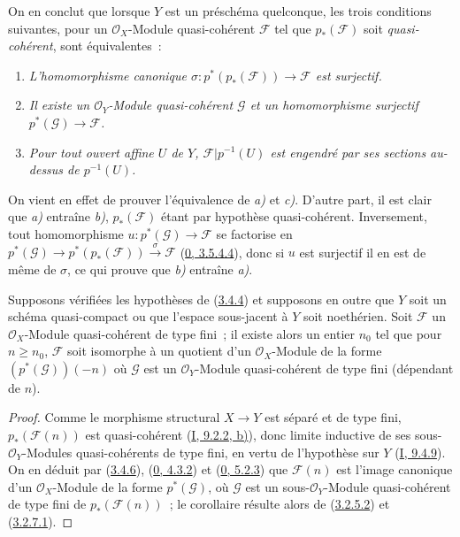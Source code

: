 
On en conclut que lorsque $Y$ est un préschéma quelconque, les trois
conditions suivantes, pour un $\mathcal{O}_X$-Module quasi-cohérent
$\mathcal{F}$ tel que $p_*(\mathcal{F})$ soit \emph{quasi-cohérent}, sont
équivalentes~:
\begin{enumerate}
  \item[a)] \emph{L'homomorphisme canonique
    $\sigma:p^*(p_*(\mathcal{F}))\to\mathcal{F}$ est surjectif.}
  \item[b)] \emph{Il existe un $\mathcal{O}_Y$-Module quasi-cohérent
    $\mathcal{G}$ et un homomorphisme surjectif
    $p^*(\mathcal{G})\to\mathcal{F}$.}
  \item[c)] \emph{Pour tout ouvert affine $U$ de $Y$,
    $\mathcal{F}|p^{-1}(U)$ est engendré par ses sections au-dessus de
    $p^{-1}(U)$.}
\end{enumerate}
On vient en effet de prouver l'équivalence de \emph{a)} et \emph{c)}. D'autre
part, il est clair que \emph{a)} entraîne \emph{b)}, $p_*(\mathcal{F})$ étant
par hypothèse quasi-cohérent. Inversement, tout homomorphisme
$u:p^*(\mathcal{G})\to\mathcal{F}$ se factorise en
$p^*(\mathcal{G})\to p^*(p_*(\mathcal{F}))\xrightarrow{\sigma}\mathcal{F}$
(\hyperref[0.3.5.4.4-fr]{0, 3.5.4.4}), donc si $u$ est surjectif il en est de
même de $\sigma$, ce qui prouve que \emph{b)} entraîne \emph{a)}.

\begin{corollary}[3.4.8]
\label{II.3.4.8-fr}
Supposons vérifiées les hypothèses de (\hyperref[II.3.4.4-fr]{3.4.4}) et
supposons en outre que $Y$ soit un schéma quasi-compact ou que l'espace
sous-jacent à $Y$ soit noethérien. Soit $\mathcal{F}$ un
$\mathcal{O}_X$-Module quasi-cohérent de type fini~; il existe alors un entier
$n_0$ tel que pour $n\geq n_0$, $\mathcal{F}$ soit isomorphe à un quotient
d'un $\mathcal{O}_X$-Module de la forme $(p^*(\mathcal{G}))(-n)$ où
$\mathcal{G}$ est un $\mathcal{O}_Y$-Module quasi-cohérent de type fini
(dépendant de $n$).
\end{corollary}

\begin{proof}
Comme le morphisme structural $X\to Y$ est séparé et de type fini,
$p_*(\mathcal{F}(n))$ est quasi-cohérent
(\hyperref[I.9.2.2-fr]{I, 9.2.2, b)}), donc limite inductive de ses
sous-$\mathcal{O}_Y$-Modules quasi-cohérents de type fini, en vertu de
l'hypothèse sur $Y$ (\hyperref[I.9.4.9-fr]{I, 9.4.9}). On en déduit par
(\hyperref[II.3.4.6-fr]{3.4.6}),
(\hyperref[0.4.3.2-fr]{0, 4.3.2}) et
(\hyperref[0.5.2.3-fr]{0, 5.2.3}) que $\mathcal{F}(n)$ est l'image canonique
d'un $\mathcal{O}_X$-Module de la forme $p^*(\mathcal{G})$, où $\mathcal{G}$
est un sous-$\mathcal{O}_Y$-Module quasi-cohérent de type fini de
$p_*(\mathcal{F}(n))$~; le corollaire résulte alors de
(\hyperref[II.3.2.5.2-fr]{3.2.5.2}) et
(\hyperref[II.3.2.7.1-fr]{3.2.7.1}).
\end{proof}

